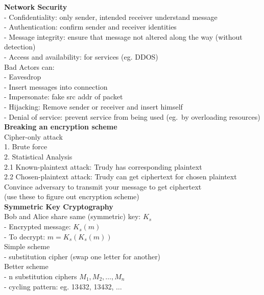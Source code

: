 \documentclass[10pt, a4paper]{article}
\newcommand{\red}[1]{{\color{red}#1}}
\newcommand{\tab}[0]{\hspace*{2mm}}
\begin{document}
\begin{multicols*}{3}
		{\normalsize\textbf{Network Security}}\\
		- \red{Confidentiality}: only sender, intended receiver understand message\\
		- \red{Authentication}: confirm sender and receiver identities\\
		- \red{Message integrity}: ensure that message not altered along the way (without detection)\\
		- \red{Access and availability}: for services (eg. DDOS)\\

		Bad Actors can:\\
		- Eavesdrop\\
		- Insert messages into connection\\
		- Impersonate: fake src addr of packet\\
		- Hijacking: Remove sender or receiver and insert himself\\
		- Denial of service: prevent service from being used (eg.\ by overloading resources)\\

		\textbf{Breaking an encryption scheme}\\
		Cipher-only attack\\
		1. Brute force\\
		2. Statistical Analysis\\
		\tab 2.1 Known-plaintext attack: Trudy has corresponding plaintext\\
		\tab 2.2 Chosen-plaintext attack: Trudy can get ciphertext for chosen plaintext\\
		\tab\tab\tab Convince adversary to transmit your message to get ciphertext\\
		\tab (use these to figure out encryption scheme)\\

		\textbf{Symmetric Key Cryptography}\\
		Bob and Alice share same (symmetric) key: $K_{s}$\\
		- Encrypted message: $K_{s}(m)$\\
		- To decrypt: $m = K_{s}(K_{s}(m))$\\

		Simple scheme\\
		- substitution cipher (swap one letter for another)\\

		Better scheme\\
		- n substitution ciphers $M_{1}, M_{2}, \ldots, M_{n}$\\
		- cycling pattern: eg. 13432, 13432, $\ldots$\\


\end{multicols*}
\end{document}
